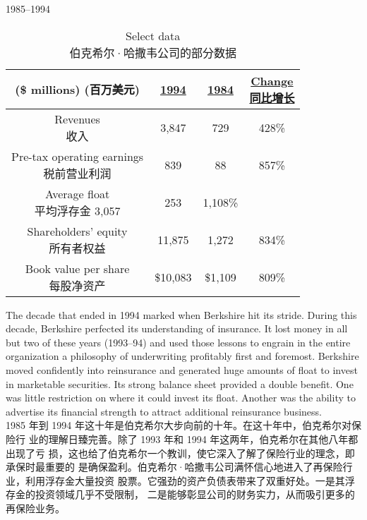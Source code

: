 \begin{section}{1985--1994}

\begin{table}[!htbp]
  \centering
  \begin{center}
    \begin{tabular}{cccc}
      \toprule
      \makecell[c]{(\$ millions) \\ (百万美元)} & \underline{1994} & \underline{1984} & \makecell[c]{\underline{Change} \\ \underline{同比增长}} \\
      \midrule
      \makecell[c]{Revenues \\ 收入} & 3,847 & 729 & 428\% \\
      \makecell[c]{Pre-tax operating earnings \\ 税前营业利润} & 839 & 88 & 857\% \\
      \makecell[c]{Average float \\ 平均浮存金} 3,057 & 253 & 1,108\% \\
      \makecell[c]{Shareholders' equity \\ 所有者权益} & 11,875 & 1,272 & 834\% \\
      \makecell[c]{Book value per share \\ 每股净资产} & \$10,083 & \$1,109 & 809\% \\
      \bottomrule
    \end{tabular}
    \caption{Select data \\ 伯克希尔·哈撒韦公司的部分数据}
  \end{center}
\end{table}

\begin{verseparallel}
  {
    The decade that ended in 1994 marked when Berkshire hit its stride. During
    this decade, Berkshire perfected its understanding of insurance. It lost
    money in all but two of these years (1993--94) and used those lessons to
    engrain in the entire organization a philosophy of underwriting profitably
    first and foremost. Berkshire moved confidently into reinsurance and
    generated huge amounts of float to invest in marketable securities. Its
    strong balance sheet provided a double benefit. One was little restriction
    on where it could invest its float. Another was the ability to advertise its
    financial strength to attract additional reinsurance business. \\
  }
  {
    1985 年到 1994 年这十年是伯克希尔大步向前的十年。在这十年中，伯克希尔对保险行
    业的理解日臻完善。除了 1993 年和 1994 年这两年，伯克希尔在其他八年都出现了亏
    损，这也给了伯克希尔一个教训，使它深入了解了保险行业的理念，即承保时最重要的
    是确保盈利。伯克希尔·哈撒韦公司满怀信心地进入了再保险行业，利用浮存金大量投资
    股票。它强劲的资产负债表带来了双重好处。一是其浮存金的投资领域几乎不受限制，
    二是能够彰显公司的财务实力，从而吸引更多的再保险业务。
  }
\end{verseparallel}


\end{section}
